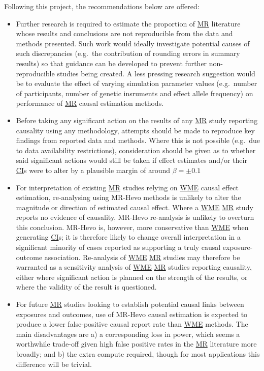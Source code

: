 \documentclass[
]{article}
\begin{document}
Following this project, the recommendations below are offered:

\begin{itemize}
\item
  Further research is required to estimate the proportion of \hyperref[acronyms_MR]{MR} literature whose results and conclusions are not reproducible from the data and methods presented. Such work would ideally investigate potential causes of such discrepancies (e.g.~the contribution of rounding errors in summary results) so that guidance can be developed to prevent further non-reproducible studies being created. A less pressing research suggestion would be to evaluate the effect of varying simulation parameter values (e.g.~number of participants, number of genetic insruments and effect allele frequency) on performance of \hyperref[acronyms_MR]{MR} causal estimation methods.
\item
  Before taking any significant action on the results of any \hyperref[acronyms_MR]{MR} study reporting causality using any methodology, attempts should be made to reproduce key findings from reported data and methods. Where this is not possible (e.g.~due to data availability restrictions), consideration should be given as to whether said significant actions would still be taken if effect estimates and/or their \hyperref[acronyms_CI]{CI}s were to alter by a plausible margin of around \(\beta = \pm 0.1\)
\item
  For interpretation of existing \hyperref[acronyms_MR]{MR} studies relying on \hyperref[acronyms_WME]{WME} causal effect estimation, re-analysing using MR-Hevo methods is unlikely to alter the magnitude or direction of estimated causal effect. Where a \hyperref[acronyms_WME]{WME} \hyperref[acronyms_MR]{MR} study reports no evidence of causality, MR-Hevo re-analysis is unlikely to overturn this conclusion. MR-Hevo is, however, more conservative than \hyperref[acronyms_WME]{WME} when generating \hyperref[acronyms_CI]{CI}s; it is therefore likely to change overall interpretation in a significant minority of cases reported as supporting a truly causal exposure-outcome association. Re-analysis of \hyperref[acronyms_WME]{WME} \hyperref[acronyms_MR]{MR} studies may therefore be warranted as a sensitivity analysis of \hyperref[acronyms_WME]{WME} \hyperref[acronyms_MR]{MR} studies reporting causality, either where significant action is planned on the strength of the results, or where the validity of the result is questioned.
\item
  For future \hyperref[acronyms_MR]{MR} studies looking to establish potential causal links between exposures and outcomes, use of MR-Hevo causal estimation is expected to produce a lower false-positive causal report rate than \hyperref[acronyms_WME]{WME} methods. The main disadvantages are a) a corresponding loss in power, which seems a worthwhile trade-off given high false positive rates in the \hyperref[acronyms_MR]{MR} literature more broadly; and b) the extra compute required, though for most applications this difference will be trivial.
\end{itemize}
\end{document}
